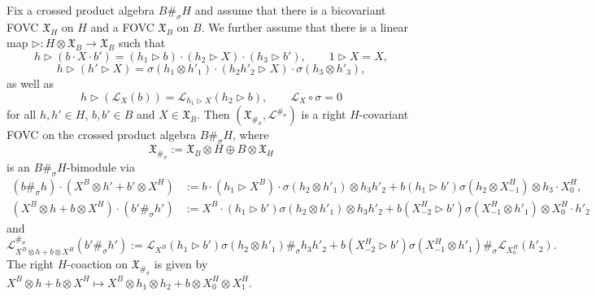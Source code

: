 \documentclass{article}
\theoremstyle{definition}
\begin{document}
Fix a crossed product algebra $B\#_\sigma H$ and assume that there is a bicovariant FOVC $\mathfrak{X}_H$ on $H$ and a FOVC $\mathfrak{X}_B$ on $B$. We further assume that there is a linear map $\rhd\colon H\otimes\mathfrak{X}_B\to\mathfrak{X}_B$ such that
\begin{equation}\label{eq:crossed1}
	h\rhd(b\cdot X\cdot b')=(h_1\rhd b)\cdot(h_2\rhd X)\cdot(h_3\rhd b'),\qquad
	1\rhd X=X,    
\end{equation}
\begin{equation}\label{eq:crossed2}
	h\rhd(h'\rhd X)=\sigma(h_1\otimes h'_1)\cdot(h_2h'_2\rhd X)\cdot\sigma(h_3\otimes h'_3),    
\end{equation}
as well as
\begin{equation}\label{eq:crossed3}
	h\rhd(\mathscr{L}_X(b))=\mathscr{L}_{h_1\rhd X}(h_2\rhd b),\qquad
	\mathscr{L}_X\circ\sigma=0
\end{equation}
for all $h,h'\in H$, $b,b'\in B$ and $X\in\mathfrak{X}_B$.
Then $(\mathfrak{X}_{\#_\sigma},\mathscr{L}^{\#_\sigma})$ is a right $H$-covariant FOVC on the crossed product algebra $B\#_\sigma H$, where
\begin{equation}\label{eq:crossed4}
	\mathfrak{X}_{\#_\sigma}:=\mathfrak{X}_B\otimes H\oplus B\otimes\mathfrak{X}_H
\end{equation}
is an $B\#_\sigma H$-bimodule via
\begin{align*}
	(b\#_\sigma h)\cdot(X^B\otimes h'+b'\otimes X^H)
	&:=b\cdot(h_1\rhd X^B)\cdot\sigma(h_2\otimes h'_1)\otimes h_3h'_2
	+b(h_1\rhd b')\sigma(h_2\otimes X^H_{-1})\otimes h_3\cdot X^H_0,\\
	(X^B\otimes h+b\otimes X^H)\cdot(b'\#_\sigma h')
	&:=X^B\cdot(h_1\rhd b')\sigma(h_2\otimes h'_1)\otimes h_3h'_2
	+b(X^H_{-2}\rhd b')\sigma(X^H_{-1}\otimes h'_1)\otimes X^H_0\cdot h'_2
\end{align*}
and
\begin{equation}\label{eq:crossed5}
	\mathscr{L}^{\#_\sigma}_{X^B\otimes h+b\otimes X^H}(b'\#_\sigma h')
	:=\mathscr{L}_{X^B}(h_1\rhd b')\sigma(h_2\otimes h'_1)\#_\sigma h_3h'_2
	+b(X^H_{-2}\rhd b')\sigma(X^H_{-1}\otimes h'_1)\#_\sigma\mathscr{L}_{X^H_0}(h'_2).
\end{equation}
The right $H$-coaction on $\mathfrak{X}_{\#_\sigma}$ is given by $X^B\otimes h+b\otimes X^H\mapsto X^B\otimes h_1\otimes h_2+b\otimes X^H_0\otimes X^H_1$.
\end{document}
